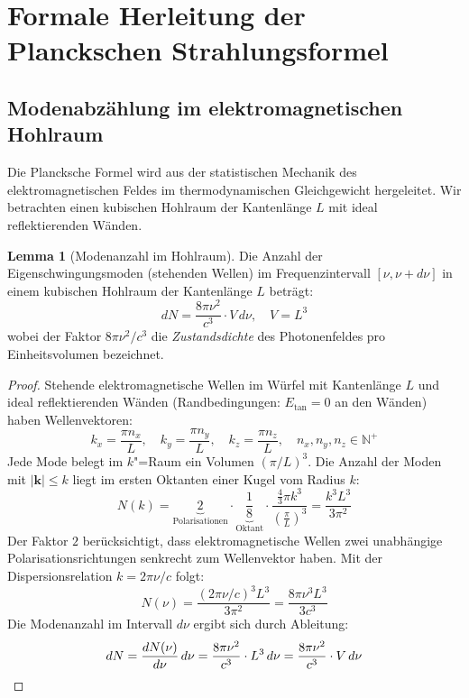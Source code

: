 ﻿\documentclass[a4paper,12pt]{article}
\theoremstyle{definition}
\newtheorem{lemma}{Lemma}
\begin{document}
\section{Formale Herleitung der Planckschen Strahlungsformel}

\subsection{Modenabzählung im elektromagnetischen Hohlraum}

Die Plancksche Formel wird aus der statistischen Mechanik des elektromagnetischen
Feldes im thermodynamischen Gleichgewicht hergeleitet. Wir betrachten einen
kubischen Hohlraum der Kantenlänge $L$ mit ideal reflektierenden Wänden.

\begin{lemma}[Modenanzahl im Hohlraum]
\label{lem:moden}
    Die Anzahl der Eigenschwingungsmoden (stehenden Wellen) im Frequenzintervall
    $[\nu, \nu + d\nu]$ in einem kubischen Hohlraum der Kantenlänge $L$ beträgt:
    \[
        dN = \frac{8\pi \nu^2}{c^3} \cdot V \, d\nu, \quad V = L^3
    \]
    wobei der Faktor $8\pi\nu^2/c^3$ die \emph{Zustandsdichte} des Photonenfeldes
    pro Einheitsvolumen bezeichnet.
\end{lemma}

\begin{proof}
    Stehende elektromagnetische Wellen im Würfel mit Kantenlänge $L$ und
    ideal reflektierenden Wänden (Randbedingungen: $E_{\text{tan}} = 0$ an
    den Wänden) haben Wellenvektoren:
    \[
        k_x = \frac{\pi n_x}{L},\quad k_y = \frac{\pi n_y}{L},\quad
        k_z = \frac{\pi n_z}{L}, \quad n_x, n_y, n_z \in \mathbb{N}^+
    \]
    Jede Mode belegt im $k$"=Raum ein Volumen $(\pi/L)^3$.
    Die Anzahl der Moden mit $|\mathbf{k}| \leq k$ liegt im ersten Oktanten
    einer Kugel vom Radius $k$:
    \[
        N(k) = \underbrace{2}_{\text{Polarisationen}} \cdot
        \underbrace{\frac{1}{8}}_{\text{Oktant}} \cdot
        \frac{\tfrac{4}{3}\pi k^3}{\left(\tfrac{\pi}{L}\right)^3}
        = \frac{k^3 L^3}{3\pi^2}
    \]
    Der Faktor $2$ berücksichtigt, dass elektromagnetische Wellen zwei
    unabhängige Polarisationsrichtungen senkrecht zum Wellenvektor haben.
    Mit der Dispersionsrelation $k = 2\pi\nu/c$ folgt:
    \[
        N(\nu) = \frac{(2\pi\nu/c)^3 L^3}{3\pi^2} = \frac{8\pi\nu^3 L^3}{3c^3}
    \]
    Die Modenanzahl im Intervall $d\nu$ ergibt sich durch Ableitung:
    \[
        dN = \frac{dN(\nu)}{d\nu}\,d\nu
        = \frac{8\pi\nu^2}{c^3} \cdot L^3 \, d\nu
        = \frac{8\pi\nu^2}{c^3} \cdot V \, d\nu \qedhere
    \]
\end{proof}
\end{document}
